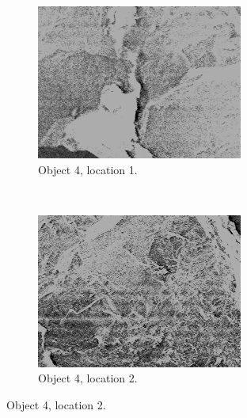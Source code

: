 \documentclass[10pt]{IEEEtran}
\begin{document}
\begin{center}
\begin{figure}[!hbt]
    \begin{subfigure}[!hbt]{0.19\textwidth}
        \includegraphics[width=\textwidth]{Object4_1}
        \caption{Object 4, location 1.}
        \label{fig:Object4_1}
    \end{subfigure}
    ~ %
    \begin{subfigure}[!hbt]{0.19\textwidth}
        \includegraphics[width=\textwidth]{Object4_2}
        \caption{Object 4, location 2.}
        \label{fig:Object4_2}
    \end{subfigure}    

\end{figure}
\end{center}
\end{document}
